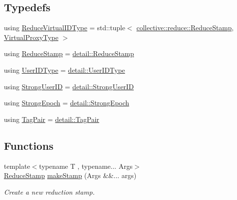 \subsection*{Typedefs}
\begin{DoxyCompactItemize}
\item 
using \hyperlink{namespacevt_1_1collective_1_1reduce_a6d4ad09f8584c3ec79f46944eb773376}{Reduce\+Virtual\+I\+D\+Type} = std\+::tuple$<$ \hyperlink{namespacevt_1_1collective_1_1reduce_a7b7cb3021ac5654d92825d9fab0250b2}{collective\+::reduce\+::\+Reduce\+Stamp}, \hyperlink{namespacevt_a1b417dd5d684f045bb58a0ede70045ac}{Virtual\+Proxy\+Type} $>$
\item 
using \hyperlink{namespacevt_1_1collective_1_1reduce_a7b7cb3021ac5654d92825d9fab0250b2}{Reduce\+Stamp} = \hyperlink{namespacevt_1_1collective_1_1reduce_1_1detail_aacc1fcd729d934ba143fee3a943bf9e7}{detail\+::\+Reduce\+Stamp}
\item 
using \hyperlink{namespacevt_1_1collective_1_1reduce_a6cdf1adaf7aedc9df00c92fe55cdcecd}{User\+I\+D\+Type} = \hyperlink{namespacevt_1_1collective_1_1reduce_1_1detail_ae82d7b96b0885b9b7dfb0104398beead}{detail\+::\+User\+I\+D\+Type}
\item 
using \hyperlink{namespacevt_1_1collective_1_1reduce_a49e47347201b1b0fdb552ed4b7c86331}{Strong\+User\+ID} = \hyperlink{namespacevt_1_1collective_1_1reduce_1_1detail_af9e42b20d1be7dccc1b5e587f0387e02}{detail\+::\+Strong\+User\+ID}
\item 
using \hyperlink{namespacevt_1_1collective_1_1reduce_a0b5fbe1e89aea537d76fda4c57f2099e}{Strong\+Epoch} = \hyperlink{namespacevt_1_1collective_1_1reduce_1_1detail_a9e57fa5e7a2557a92ce0739edae200fe}{detail\+::\+Strong\+Epoch}
\item 
using \hyperlink{namespacevt_1_1collective_1_1reduce_ae3111ccd7e2214f079222e4c016b6652}{Tag\+Pair} = \hyperlink{structvt_1_1collective_1_1reduce_1_1detail_1_1_tag_pair}{detail\+::\+Tag\+Pair}
\end{DoxyCompactItemize}
\subsection*{Functions}
\begin{DoxyCompactItemize}
\item 
{\footnotesize template$<$typename T , typename... Args$>$ }\\\hyperlink{namespacevt_1_1collective_1_1reduce_a7b7cb3021ac5654d92825d9fab0250b2}{Reduce\+Stamp} \hyperlink{namespacevt_1_1collective_1_1reduce_a16bd926f0a7f318a75d2bf921b516db3}{make\+Stamp} (Args \&\&... args)
\begin{DoxyCompactList}\small\item\em Create a new reduction stamp. \end{DoxyCompactList}\end{DoxyCompactItemize}


